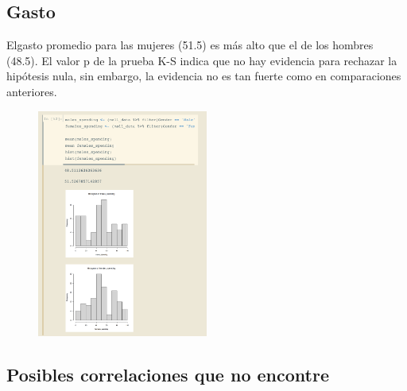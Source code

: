 \documentclass[12pt, fleqn]{report}                             %
\theoremstyle{break}                                            %
\begin{document}
            \clearpage
            \subsection{Gasto}

                Elgasto promedio para las mujeres (51.5) es más alto que el de los hombres (48.5). 
                El valor p de la prueba K-S indica que no hay evidencia para rechazar la hipótesis nula, 
                sin embargo, la evidencia no es tan fuerte como en comparaciones anteriores.

                \begin{figure}[ht!]
                    \centering
                    \includegraphics[width=0.5\textwidth]{8}
                \end{figure}

            \clearpage
            \subsection{Posibles correlaciones que no encontre}
\end{document}
